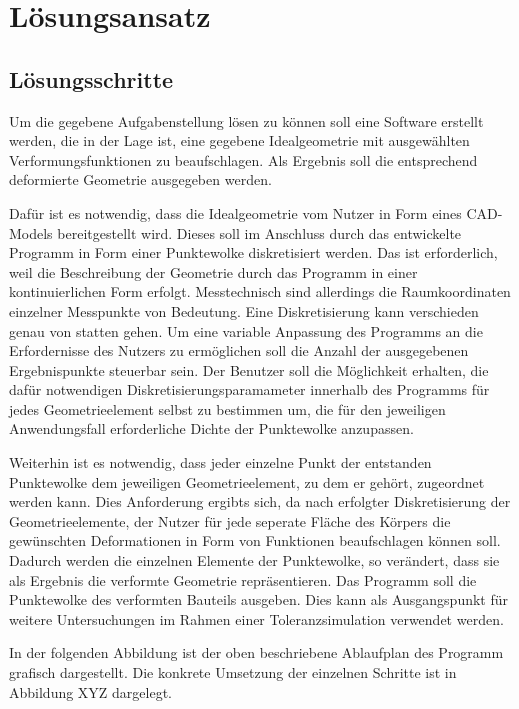 \section{Lösungsansatz}

\subsection{Lösungsschritte}

Um die gegebene Aufgabenstellung lösen zu können soll eine Software erstellt werden, die in der Lage ist, eine gegebene Idealgeometrie mit ausgewählten Verformungsfunktionen zu beaufschlagen. Als Ergebnis soll die entsprechend deformierte Geometrie ausgegeben werden. 

Dafür ist es notwendig, dass die Idealgeometrie vom Nutzer in Form eines CAD-Models bereitgestellt wird. Dieses soll im Anschluss durch das entwickelte Programm in Form einer Punktewolke diskretisiert werden. Das ist erforderlich, weil die Beschreibung der Geometrie durch das Programm in einer kontinuierlichen Form erfolgt. Messtechnisch sind allerdings die Raumkoordinaten einzelner Messpunkte von Bedeutung. Eine Diskretisierung kann verschieden genau von statten gehen. Um eine variable Anpassung des Programms an die Erfordernisse des Nutzers zu ermöglichen soll die Anzahl der ausgegebenen Ergebnispunkte steuerbar sein. Der Benutzer soll die Möglichkeit erhalten, die dafür notwendigen Diskretisierungsparamameter innerhalb des Programms für jedes Geometrieelement selbst zu bestimmen um, die für den jeweiligen Anwendungsfall erforderliche Dichte der Punktewolke anzupassen.

Weiterhin ist es notwendig, dass jeder einzelne Punkt der entstanden Punktewolke dem jeweiligen Geometrieelement, zu dem er gehört, zugeordnet werden kann. Dies Anforderung ergibts sich, da nach erfolgter Diskretisierung der Geometrieelemente, der Nutzer für jede seperate Fläche des Körpers die gewünschten Deformationen in Form von Funktionen  beaufschlagen können soll. Dadurch werden die einzelnen Elemente der Punktewolke, so verändert, dass sie als Ergebnis die verformte Geometrie repräsentieren. 
Das Programm soll die Punktewolke des verformten Bauteils ausgeben. Dies kann als Ausgangspunkt für weitere Untersuchungen im Rahmen einer Toleranzsimulation verwendet werden. 

In der folgenden Abbildung ist der oben beschriebene Ablaufplan des Programm grafisch dargestellt. Die konkrete Umsetzung der einzelnen Schritte ist in Abbildung XYZ dargelegt.        
 
